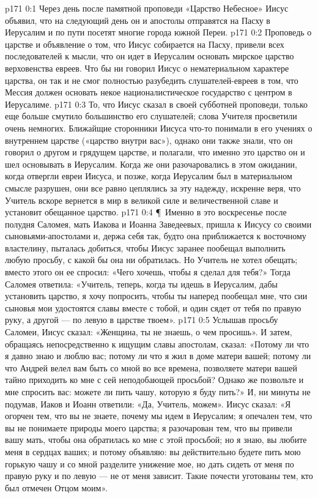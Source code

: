 \vs p171 0:1 Через день после памятной проповеди «Царство Небесное» Иисус объявил, что на следующий день он и апостолы отправятся на Пасху в Иерусалим и по пути посетят многие города южной Переи.
\vs p171 0:2 Проповедь о царстве и объявление о том, что Иисус собирается на Пасху, привели всех последователей к мысли, что он идет в Иерусалим основать мирское царство верховенства евреев. Что бы ни говорил Иисус о нематериальном характере царства, он так и не смог полностью разубедить слушателей\hyp{}евреев в том, что Мессия должен основать некое националистическое государство с центром в Иерусалиме.
\vs p171 0:3 То, что Иисус сказал в своей субботней проповеди, только еще больше смутило большинство его слушателей; слова Учителя просветили очень немногих. Ближайщие сторонники Иисуса что\hyp{}то понимали в его учениях о внутреннем царстве («царство внутри вас»), однако они также знали, что он говорил о другом и грядущем царстве, и полагали, что именно это царство он и шел основывать в Иерусалим. Когда же они разочаровались в этом ожидании, когда отвергли евреи Иисуса, и позже, когда Иерусалим был в материальном смысле разрушен, они все равно цеплялись за эту надежду, искренне веря, что Учитель вскоре вернется в мир в великой силе и величественной славе и установит обещанное царство.
\vs p171 0:4 \P\ Именно в это воскресенье после полудня Саломея, мать Иакова и Иоанна Заведеевых, пришла к Иисусу со своими сыновьями\hyp{}апостолами и, держа себя так, будто она приближается к восточному властелину, пыталась добиться, чтобы Иисус заранее пообещал выполнить любую просьбу, с какой бы она ни обратилась. Но Учитель не хотел обещать; вместо этого он ее спросил: «Чего хочешь, чтобы я сделал для тебя?» Тогда Саломея ответила: «Учитель, теперь, когда ты идешь в Иерусалим, дабы установить царство, я хочу попросить, чтобы ты наперед пообещал мне, что сии сыновья мои удостоятся славы вместе с тобой, и один сядет от тебя по правую руку, а другой --- по левую в царстве твоем».
\vs p171 0:5 Услышав просьбу Саломеи, Иисус сказал: «Женщина, ты не знаешь, о чем просишь». И затем, обращаясь непосредственно к ищущим славы апостолам, сказал: «Потому ли что я давно знаю и люблю вас; потому ли что я жил в доме матери вашей; потому ли что Андрей велел вам быть со мной во все времена, позволяете матери вашей тайно приходить ко мне с сей неподобающей просьбой? Однако же позвольте и мне спросить вас: можете ли пить чашу, которую я буду пить?» И, ни минуты не подумав, Иаков и Иоанн ответили: «Да, Учитель, можем». Иисус сказал: «Я огорчен тем, что вы не знаете, почему мы идем в Иерусалим; я опечален тем, что вы не понимаете природы моего царства; я разочарован тем, что вы привели вашу мать, чтобы она обратилась ко мне с этой просьбой; но я знаю, вы любите меня в сердцах ваших; и потому объявляю: вы действительно будете пить мою горькую чашу и со мной разделите унижение мое, но дать сидеть от меня по правую руку и по левую --- не от меня зависит. Такие почести уготованы тем, кто был отмечен Отцом моим».
